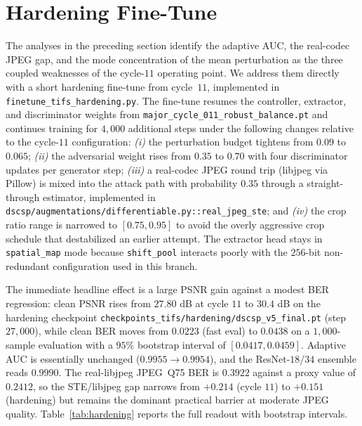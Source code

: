 \documentclass[journal]{IEEEtran}
\begin{document}
\section{Hardening Fine-Tune}
\label{sec:hardening}

The analyses in the preceding section identify the adaptive AUC, the real-codec JPEG gap, and the mode concentration of the mean perturbation as the three coupled weaknesses of the cycle-$11$ operating point. We address them directly with a short hardening fine-tune from cycle~$11$, implemented in \texttt{finetune\_tifs\_hardening.py}. The fine-tune resumes the controller, extractor, and discriminator weights from \texttt{major\_cycle\_011\_robust\_balance.pt} and continues training for $4{,}000$ additional steps under the following changes relative to the cycle-$11$ configuration: \emph{(i)} the perturbation budget tightens from $0.09$ to $0.065$; \emph{(ii)} the adversarial weight rises from $0.35$ to $0.70$ with four discriminator updates per generator step; \emph{(iii)} a real-codec JPEG round trip (libjpeg via Pillow) is mixed into the attack path with probability $0.35$ through a straight-through estimator, implemented in \texttt{dscsp/augmentations/differentiable.py::real\_jpeg\_ste}; and \emph{(iv)} the crop ratio range is narrowed to $[0.75, 0.95]$ to avoid the overly aggressive crop schedule that destabilized an earlier attempt. The extractor head stays in \texttt{spatial\_map} mode because \texttt{shift\_pool} interacts poorly with the $256$-bit non-redundant configuration used in this branch.

The immediate headline effect is a large PSNR gain against a modest BER regression: clean PSNR rises from $27.80$ dB at cycle $11$ to $30.4$ dB on the hardening checkpoint \texttt{checkpoints\_tifs/hardening/dscsp\_v5\_final.pt} (step $27{,}000$), while clean BER moves from $0.0223$ (fast eval) to $0.0438$ on a $1{,}000$-sample evaluation with a $95\%$ bootstrap interval of $[0.0417, 0.0459]$. Adaptive AUC is essentially unchanged ($0.9955 \rightarrow 0.9954$), and the ResNet-$18$/$34$ ensemble reads $0.9990$. The real-libjpeg JPEG~Q75 BER is $0.3922$ against a proxy value of $0.2412$, so the STE/libjpeg gap narrows from $+0.214$ (cycle $11$) to $+0.151$ (hardening) but remains the dominant practical barrier at moderate JPEG quality. Table~\ref{tab:hardening} reports the full readout with bootstrap intervals.
\end{document}
